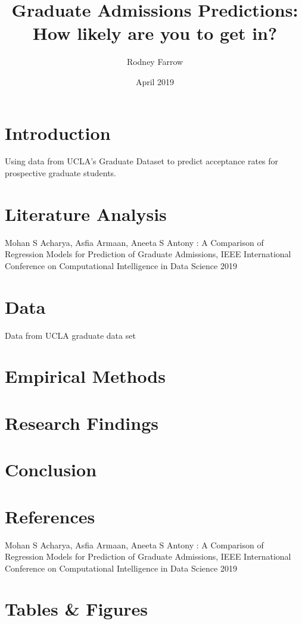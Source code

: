 \documentclass[12pt,english]{article}
\title{Graduate Admissions Predictions: 
How likely are you to get in?}
\author{Rodney Farrow}
\date{April 2019}
\begin{document}
\maketitle

\section{Introduction}
    Using data from UCLA's Graduate Dataset to predict acceptance rates for prospective graduate students.
\section{Literature Analysis}
    Mohan S Acharya, Asfia Armaan, Aneeta S Antony : A Comparison of Regression Models for Prediction of Graduate Admissions, IEEE International Conference on Computational Intelligence in Data Science 2019
\section{Data}
Data from UCLA graduate data set
\section{Empirical Methods}
\section{Research Findings}
\section{Conclusion}
\section{References}
    Mohan S Acharya, Asfia Armaan, Aneeta S Antony : A Comparison of Regression Models for Prediction of Graduate Admissions, IEEE International Conference on Computational Intelligence in Data Science 2019
\section{Tables & Figures}
\end{document}
